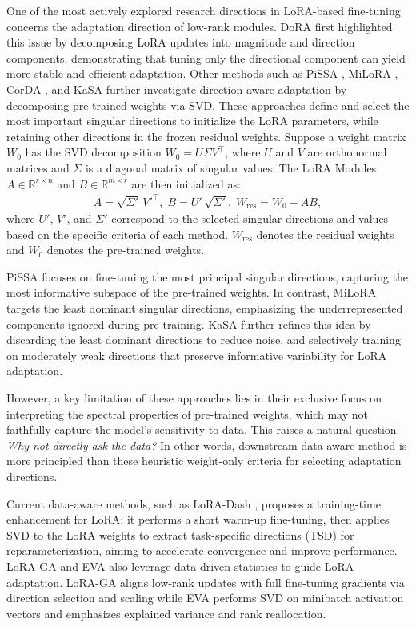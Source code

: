 \documentclass{article}
\theoremstyle{plain}
\theoremstyle{definition}
\theoremstyle{remark}
\begin{document}
One of the most actively explored research directions in LoRA-based fine-tuning concerns the adaptation direction of low-rank modules. DoRA \cite{DORA} first highlighted this issue by decomposing LoRA updates into magnitude and direction components, demonstrating that tuning only the directional component can yield more stable and efficient adaptation. Other methods such as PiSSA \cite{PISSA}, MiLoRA \cite{MILORA}, CorDA \cite{CORDA}, and KaSA \cite{KASA} further investigate direction-aware adaptation by decomposing pre-trained weights via SVD. These approaches define and select the most important singular directions to initialize the LoRA parameters, while retaining other directions in the frozen residual weights. Suppose a weight matrix $W_0$ has the SVD decomposition $W_0 = U \Sigma V^\top$, where $U$ and $V$ are orthonormal matrices and $\Sigma$ is a diagonal matrix of singular values. The LoRA Modules $A \in \mathbb{R}^{r \times n}$ and $B \in \mathbb{R}^{m \times r}$ are then initialized as:
\begin{align}
A = \sqrt{\Sigma'}\, V'^\top, \;
B = U'\, \sqrt{\Sigma'}, \;
W_{\text{res}} = W_0 - AB, 
\end{align}
where $U'$, $V'$, and $\Sigma'$ correspond to the selected singular directions and values based on the specific criteria of each method. $W_\text{res}$ denotes the residual weights and $W_0$ denotes the pre-trained weights.

PiSSA focuses on fine-tuning the most principal singular directions, capturing the most informative subspace of the pre-trained weights. In contrast, MiLoRA targets the least dominant singular directions, emphasizing the underrepresented components ignored during pre-training. KaSA further refines this idea by discarding the least dominant directions to reduce noise, and selectively training on moderately weak directions that preserve informative variability for LoRA adaptation.

However, a key limitation of these approaches lies in their exclusive focus on interpreting the spectral properties of pre-trained weights, which may not faithfully capture the model's sensitivity to data. This raises a natural question: \textit{Why not directly ask the data?} In other words, downstream data-aware method is more principled than these heuristic weight-only criteria for selecting adaptation directions.

Current data-aware methods, such as LoRA-Dash \cite{LORADASH}, proposes a training-time enhancement for LoRA: it performs a short warm-up fine-tuning, then applies SVD to the LoRA weights to extract task-specific directions (TSD) for reparameterization, aiming to accelerate convergence and improve performance. LoRA-GA \cite{LORAGA} and EVA \cite{EVA} also leverage data-driven statistics to guide LoRA adaptation. LoRA-GA aligns low-rank updates with full fine-tuning gradients via direction selection and scaling while EVA performs SVD on minibatch activation vectors and emphasizes explained variance and rank reallocation.
\end{document}

